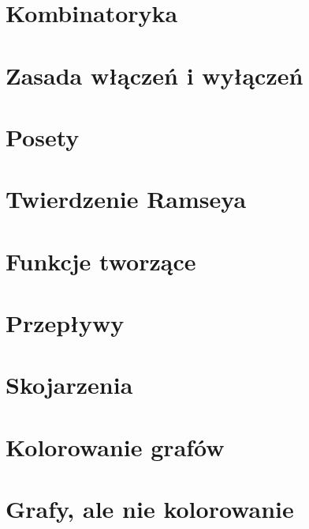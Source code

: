 \documentclass[12pt, a4paper, polish, openany]{book}
\author{
}
\begin{document}
\frontmatter



\tableofcontents


\mainmatter

\chapter{Kombinatoryka}


\chapter{Zasada włączeń i wyłączeń}


\chapter{Posety}


\chapter{Twierdzenie Ramseya}


\chapter{Funkcje tworzące}


\chapter{Przepływy}


\chapter{Skojarzenia}


\chapter{Kolorowanie grafów}


\chapter{Grafy, ale nie kolorowanie}

\end{document}
